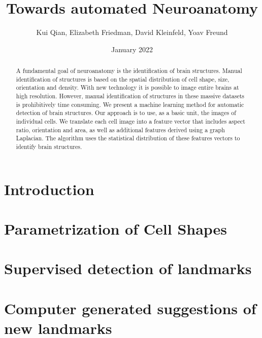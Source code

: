 \documentclass{article}
\title{Towards automated Neuroanatomy}
\author{Kui Qian, Elizabeth Friedman, David Kleinfeld, Yoav Freund}
\date{January 2022}
\begin{document}
\maketitle

\begin{abstract}
A fundamental goal of neuroanatomy is the identification of brain structures. 
Manual identification of structures is based on the spatial distribution of cell shape, size, orientation and density. 
With new technology it is possible to image entire brains at high resolution. 
However, manual identification of structures in these massive datasets is prohibitively time consuming. 
We present a machine learning method for automatic detection of brain structures. 
Our approach is to use, as a basic unit, the images of individual cells. 
We translate each cell image into a feature vector that includes aspect ratio, orientation and area, as well as additional features derived using a graph Laplacian. The algorithm uses the statistical distribution of these features vectors to identify brain structures.
\end{abstract}

\section{Introduction}

\section{Parametrization of Cell Shapes}

\section{Supervised detection of landmarks}

\section{Computer generated suggestions of new landmarks}
\end{document}
